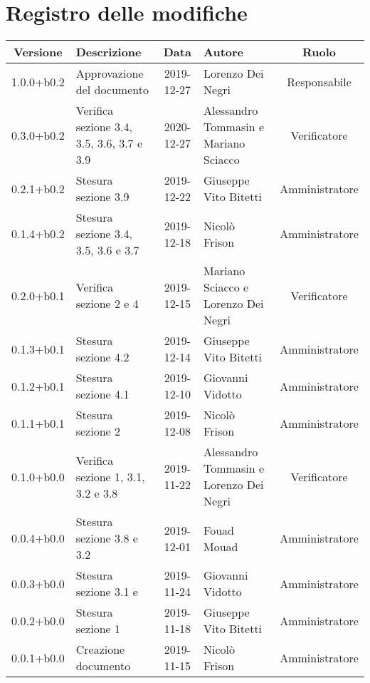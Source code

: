 \section*{Registro delle modifiche}

\begin{center}
	\begin{longtable}{|c|p{3cm}|c|p{4cm}|c|}
	\hline
	\rowcolor{lighter-grayer}
	\textbf{Versione} & \textbf{Descrizione} & \textbf{Data} & \textbf{Autore} & \textbf{Ruolo} \\
	\hline
	\endfirsthead



	\hline
	1.0.0+b0.2 & Approvazione del documento & 2019-12-27 & Lorenzo Dei Negri & Responsabile \\
	\hline 
	0.3.0+b0.2 & Verifica sezione 3.4, 3.5, 3.6, 3.7 e 3.9 & 2020-12-27 & Alessandro Tommasin e Mariano Sciacco & Verificatore\\
	\hline
	0.2.1+b0.2 & Stesura sezione 3.9 & 2019-12-22 & Giuseppe Vito Bitetti & Amministratore \\
	\hline
	0.1.4+b0.2 & Stesura sezione 3.4, 3.5, 3.6 e 3.7 & 2019-12-18 & Nicolò Frison & Amministratore \\
	\hline
	0.2.0+b0.1 & Verifica sezione 2 e 4 & 2019-12-15 & Mariano Sciacco e Lorenzo Dei Negri & Verificatore \\
	\hline
	0.1.3+b0.1 & Stesura sezione 4.2 & 2019-12-14 & Giuseppe Vito Bitetti & Amministratore \\
	\hline
	0.1.2+b0.1 & Stesura sezione 4.1 & 2019-12-10 & Giovanni Vidotto & Amministratore \\
	\hline
	0.1.1+b0.1 & Stesura sezione 2  & 2019-12-08 & Nicolò Frison & Amministratore \\
	\hline
	0.1.0+b0.0 & Verifica sezione 1, 3.1, 3.2 e 3.8 & 2019-11-22 & Alessandro Tommasin e Lorenzo Dei Negri & Verificatore \\
	\hline
	0.0.4+b0.0 & Stesura sezione 3.8 e 3.2 & 2019-12-01 & Fouad Mouad & Amministratore \\
	\hline
	0.0.3+b0.0 & Stesura sezione 3.1 e & 2019-11-24 & Giovanni Vidotto & Amministratore \\
	\hline
	0.0.2+b0.0 & Stesura sezione 1 & 2019-11-18 & Giuseppe Vito Bitetti & Amministratore \\
	\hline
	0.0.1+b0.0 & Creazione documento & 2019-11-15 & Nicolò Frison & Amministratore  \\
	\hline

	\end{longtable}
\end{center}
